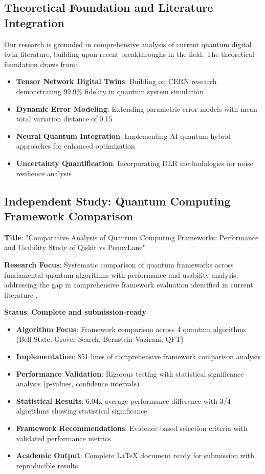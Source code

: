 \documentclass[12pt,a4paper]{article}
\begin{document}
\subsection{Theoretical Foundation and Literature Integration}

Our research is grounded in comprehensive analysis of current quantum digital twin literature, building upon recent breakthroughs in the field. The theoretical foundation draws from:

\begin{itemize}
    \item \textbf{Tensor Network Digital Twins}: Building on CERN research \cite{pagano2024ab} demonstrating 99.9\% fidelity in quantum system simulation
    \item \textbf{Dynamic Error Modeling}: Extending parametric error models \cite{muller2024towards} with mean total variation distance of 0.15
    \item \textbf{Neural Quantum Integration}: Implementing AI-quantum hybrid approaches \cite{lu2024neural} for enhanced optimization
    \item \textbf{Uncertainty Quantification}: Incorporating DLR methodologies \cite{dlr2024uncertainty} for noise resilience analysis
\end{itemize}

\subsection{Independent Study: Quantum Computing Framework Comparison}

\textbf{Title}: "Comparative Analysis of Quantum Computing Frameworks: Performance and Usability Study of Qiskit vs PennyLane"

\textbf{Research Focus}: Systematic comparison of quantum frameworks across fundamental quantum algorithms with performance and usability analysis, addressing the gap in comprehensive framework evaluation identified in current literature \cite{elsevier2025quantum}.

\textbf{Status}: \textcolor{successgreen}{\textbf{Complete and submission-ready}}

\begin{itemize}
    \item \textbf{Algorithm Focus}: Framework comparison across 4 quantum algorithms (Bell State, Grover Search, Bernstein-Vazirani, QFT)
    \item \textbf{Implementation}: 851 lines of comprehensive framework comparison analysis
    \item \textbf{Performance Validation}: Rigorous testing with statistical significance analysis (p-values, confidence intervals)
    \item \textbf{Statistical Results}: 6.04x average performance difference with 3/4 algorithms showing statistical significance  
    \item \textbf{Framework Recommendations}: Evidence-based selection criteria with validated performance metrics
    \item \textbf{Academic Output}: Complete LaTeX document ready for submission with reproducible results
\end{itemize}
\end{document}
